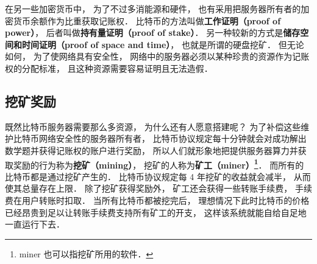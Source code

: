 在另一些加密货币中， 为了不过多消能源和硬件， 也有采用把服务器所有者的加密货币余额作为比重获取记账权． 比特币的方法叫做\textbf{工作证明（proof of power）}， 后者叫做\textbf{持有量证明（proof of stake）}． 另一种较新的方式是\textbf{储存空间和时间证明（proof of space and time）}， 也就是所谓的硬盘挖矿． 但无论如何， 为了使网络具有安全性， 网络中的服务器必须以某种珍贵的资源作为记账权的分配标准， 且这种资源需要容易证明且无法造假．

\subsection{挖矿奖励}
既然比特币服务器需要那么多资源， 为什么还有人愿意搭建呢？ 为了补偿这些维护比特币网络安全性的服务器所有者， 比特币协议规定每十分钟就会对成功解出数学题并获得记账权的账户进行奖励， 所以人们就形象地把提供服务器算力并获取奖励的行为称为\textbf{挖矿（mining）}， 挖矿的人称为\textbf{矿工（miner）\footnote{miner 也可以指挖矿所用的软件．}}． 而所有的比特币都是通过挖矿产生的． 比特币协议规定每 4 年挖矿的收益就会减半， 从而使其总量存在上限． 除了挖矿获得奖励外， 矿工还会获得一些转账手续费， 手续费在用户转账时扣取． 当所有比特币都被挖完后， 理想情况下此时比特币的价格已经昂贵到足以让转账手续费支持所有矿工的开支， 这样该系统就能自给自足地一直运行下去．
